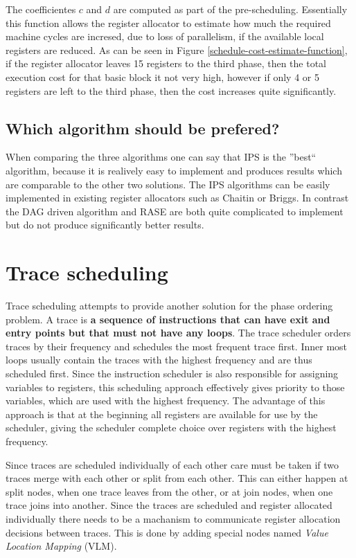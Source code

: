 \documentclass[a4paper,10pt]{article}
\begin{document}
The coefficientes $c$ and $d$ are computed as part of the pre-scheduling. Essentially this function allows the register allocator to
estimate how much the required machine cycles are incresed, due to loss of parallelism, if the available local registers are reduced.
As can be seen in Figure \ref{schedule-cost-estimate-function}, if the register allocator leaves 15 registers to the third phase,
then the total execution cost for that basic block it not very high, however if only 4 or 5 registers are left to the third phase,
then the cost increases quite significantly.

\subsection{Which algorithm should be prefered?}
When comparing the three algorithms one can say that IPS is the ''best``
algorithm, because it is realively easy to implement and produces results which are comparable to the other two solutions. The IPS
algorithms can be easily implemented in existing register allocators such as Chaitin or Briggs. In contrast the DAG driven algorithm and
RASE are both quite complicated to implement but do not produce significantly better results.

\section{Trace scheduling}
Trace scheduling attempts to provide another solution for the phase ordering problem. A trace is \textbf{a sequence of instructions that
can have exit and entry points but that must not have any loops}. The trace
scheduler orders traces by their frequency and schedules the most frequent trace first. Inner most loops usually contain
the traces with the highest frequency and are thus scheduled first. Since the instruction scheduler is also responsible for assigning
variables to registers, this scheduling approach effectively gives priority to those variables, which are used with the highest frequency.
The advantage of this approach is that at the beginning all registers are available for use by the scheduler, giving the scheduler
complete choice over registers with the highest frequency.

Since traces are scheduled individually of each other care must be taken if two traces merge with each other or split from each other.
This can either happen at split nodes, when one trace leaves from the other, or at join nodes, when one trace joins into another. Since
the traces are scheduled and register allocated individually there needs to be a machanism to communicate register allocation decisions
between traces. This is done by adding special nodes named \textit{Value Location Mapping} (VLM).
\end{document}
